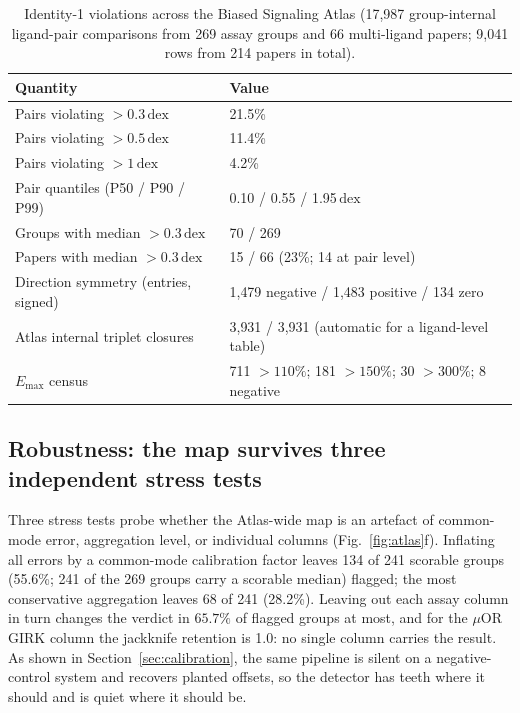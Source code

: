 ﻿\documentclass[11pt,a4paper]{article}
\newcommand{\dex}{\ensuremath{\,\mathrm{dex}}}
\newcommand{\Emax}{\ensuremath{E_{\max}}}
\begin{document}
\begin{table}[!htbp]
\centering
\caption{Identity-1 violations across the Biased Signaling Atlas (17{,}987 group-internal ligand-pair comparisons from 269 assay groups and 66 multi-ligand papers; 9{,}041 rows from 214 papers in total).}
\label{tab:atlas}
\small
\begin{tabular}{@{}ll@{}}
\toprule
Quantity & Value \\
\midrule
Pairs violating $>0.3\dex$ & 21.5\% \\
Pairs violating $>0.5\dex$ & 11.4\% \\
Pairs violating $>1\dex$ & 4.2\% \\
Pair quantiles (P50 / P90 / P99) & 0.10 / 0.55 / 1.95$\dex$ \\
Groups with median $>0.3\dex$ & 70 / 269 \\
Papers with median $>0.3\dex$ & 15 / 66 (23\%; 14 at pair level) \\
Direction symmetry (entries, signed) & 1{,}479 negative / 1{,}483 positive / 134 zero \\
Atlas internal triplet closures & 3{,}931 / 3{,}931 (automatic for a ligand-level table) \\
$\Emax$ census & 711 $>110\%$; 181 $>150\%$; 30 $>300\%$; 8 negative \\
\bottomrule
\end{tabular}
\end{table}

\subsection{Robustness: the map survives three independent stress tests}
\label{sec:robustness}

Three stress tests probe whether the Atlas-wide map is an artefact of common-mode error, aggregation level, or individual columns (Fig.~\ref{fig:atlas}f). Inflating all errors by a common-mode calibration factor leaves 134 of 241 scorable groups (55.6\%; 241 of the 269 groups carry a scorable median) flagged; the most conservative aggregation leaves 68 of 241 (28.2\%). Leaving out each assay column in turn changes the verdict in $65.7\%$ of flagged groups at most, and for the $\mu$OR GIRK column the jackknife retention is 1.0: no single column carries the result. As shown in Section~\ref{sec:calibration}, the same pipeline is silent on a negative-control system and recovers planted offsets, so the detector has teeth where it should and is quiet where it should be.
\end{document}
